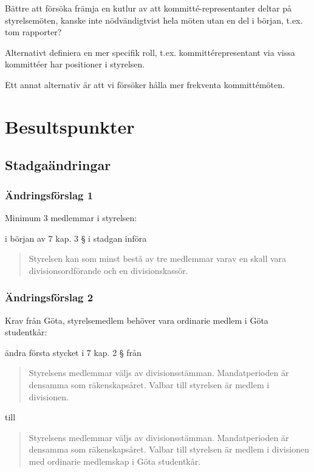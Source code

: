 \documentclass[protokoll]{dvd}
\begin{document}
Bättre att försöka främja en kutlur av att kommitté-representanter deltar på styrelsemöten, kanske inte nödvändigtvist hela möten utan en del i början, t.ex. tom rapporter?

Alternativt definiera en mer specifik roll, t.ex. kommittérepresentant via vissa kommittéer har positioner i styrelsen. 

Ett annat alternativ är att vi försöker hålla mer frekventa kommittémöten. 

\section{Besultspunkter}

\subsection{Stadgaändringar}
\subsubsection*{Ändringsförslag 1}
Minimum 3 medlemmar i styrelsen: 
\begin{attsatser}
    \item i början av 7 kap. 3 § i stadgan införa 
    \begin{quote}
        Styrelsen kan som minst bestå av tre medlemmar varav en skall vara divisionsordförande och en divisionskassör. 
    \end{quote}
\end{attsatser}

\subsubsection*{Ändringsförslag 2}
Krav från Göta, styrelsemedlem behöver vara ordinarie medlem i Göta studentkår:
\begin{attsatser}
    \item ändra första stycket i 7 kap. 2 § från
    \begin{quote}
        Styrelsens medlemmar väljs av divisionsstämman. Mandatperioden är densamma som räkenskapsåret. Valbar till styrelsen är medlem i divisionen.
    \end{quote}
    till
    \begin{quote}
        Styrelsens medlemmar väljs av divisionsstämman. Mandatperioden är densamma som räkenskapsåret. Valbar till styrelsen är medlem i divisionen med ordinarie medlemskap i Göta studentkår.
    \end{quote}
\end{attsatser}
\end{document}
